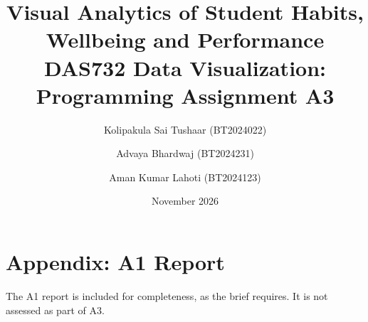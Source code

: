 \documentclass[11pt]{article}
\title{\textbf{Visual Analytics of Student Habits, Wellbeing and Performance}\\[4pt]
\large DAS732 Data Visualization: Programming Assignment A3}
\author{Kolipakula Sai Tushaar (BT2024022) \and Advaya Bhardwaj (BT2024231) \and Aman Kumar Lahoti (BT2024123)}
\date{November 2026}
\begin{document}
\maketitle
\tableofcontents
\clearpage




\clearpage

\clearpage

\clearpage

\clearpage





\clearpage
\appendix
\section{Appendix: A1 Report}
\label{app:a1}
The A1 report is included for completeness, as the brief requires. It is not
assessed as part of A3.

\end{document}
